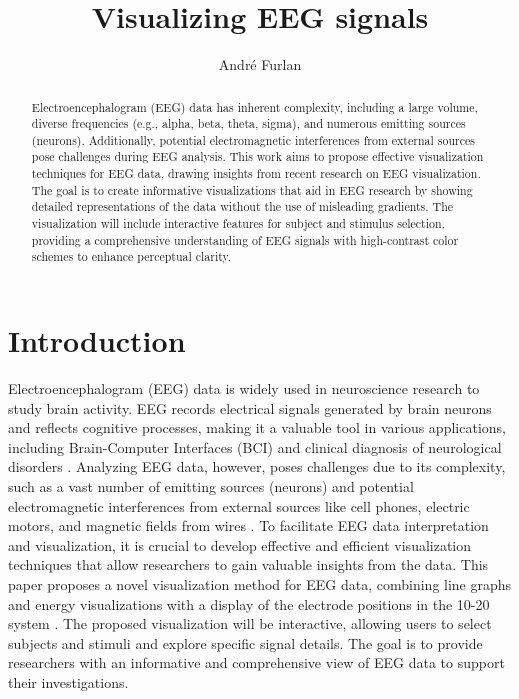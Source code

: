 \documentclass[format=acmtog]{acmart}
\title{Visualizing EEG signals}
\author{André Furlan}
\affiliation{
	\institution{UNESP - Universidade Estadual Paulista Júlio de Mesquita Filho}
	\city{São José do Rio Preto}
	\state{André Furlan}
	\country{Brazil}
}
\begin{document}
	
	\begin{abstract}
		Electroencephalogram (EEG) data has inherent complexity, including a large volume, diverse frequencies (e.g., alpha, beta, theta, sigma), and numerous emitting sources (neurons). Additionally, potential electromagnetic interferences from external sources pose challenges during EEG analysis. This work aims to propose effective visualization techniques for EEG data, drawing insights from recent research on EEG visualization. The goal is to create informative visualizations that aid in EEG research by showing detailed representations of the data without the use of misleading gradients. The visualization will include interactive features for subject and stimulus selection, providing a comprehensive understanding of EEG signals with high-contrast color schemes to enhance perceptual clarity.
	\end{abstract}
	
	\maketitle
	
	\section{Introduction}
		\par Electroencephalogram (EEG) data is widely used in neuroscience research to study brain activity. EEG records electrical signals generated by brain neurons and reflects cognitive processes, making it a valuable tool in various applications, including Brain-Computer Interfaces (BCI) and clinical diagnosis of neurological disorders \cite{8937083}. Analyzing EEG data, however, poses challenges due to its complexity, such as a vast number of emitting sources (neurons) and potential electromagnetic interferences from external sources like cell phones, electric motors, and magnetic fields from wires \cite{8937083}. To facilitate EEG data interpretation and visualization, it is crucial to develop effective and efficient visualization techniques that allow researchers to gain valuable insights from the data. This paper proposes a novel visualization method for EEG data, combining line graphs and energy visualizations with a display of the electrode positions in the 10-20 system \cite{sistema10-20}. The proposed visualization will be interactive, allowing users to select subjects and stimuli and explore specific signal details. The goal is to provide researchers with an informative and comprehensive view of EEG data to support their investigations.
	
\end{document}
